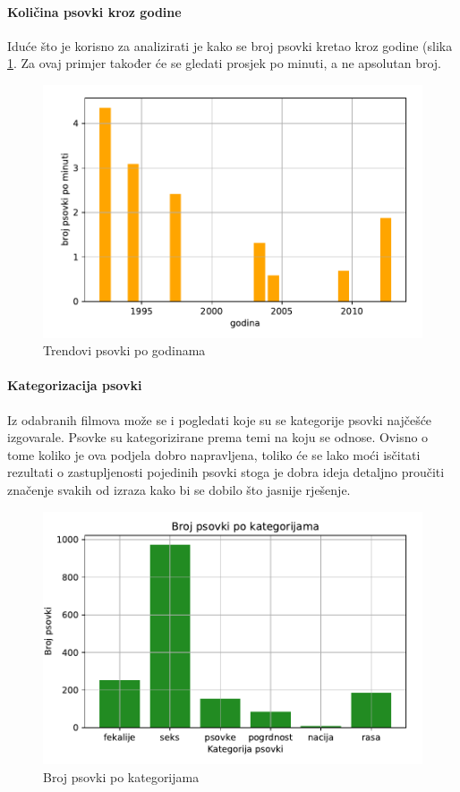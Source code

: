 \documentclass[11pt]{foi}
\begin{document}
\paragraph{Količina psovki kroz godine}

Iduće što je korisno za analizirati je kako se broj psovki kretao kroz godine
(slika \ref{psovke_godine}.  Za ovaj primjer također će se gledati prosjek po
minuti, a ne apsolutan broj.

\begin{figure}[h]
	\centering
	\includegraphics{"slike/psovke_godine.pdf"}
	\caption{Trendovi psovki po godinama}
	\label{psovke_godine}
\end{figure}

\paragraph{Kategorizacija psovki}

Iz odabranih filmova može se i pogledati koje su se kategorije psovki najčešće
izgovarale. Psovke su kategorizirane prema temi na koju se odnose. Ovisno o
tome koliko je ova podjela dobro napravljena, toliko će se lako moći isčitati
rezultati o zastupljenosti pojedinih psovki stoga je dobra ideja detaljno
proučiti značenje svakih od izraza kako bi se dobilo što jasnije rješenje.

\begin{figure}[h]
	\centering
	\includegraphics{"slike/kategorije_total.pdf"}
	\caption{Broj psovki po kategorijama}
	\label{psovke_po_kat}
\end{figure}
\end{document}
